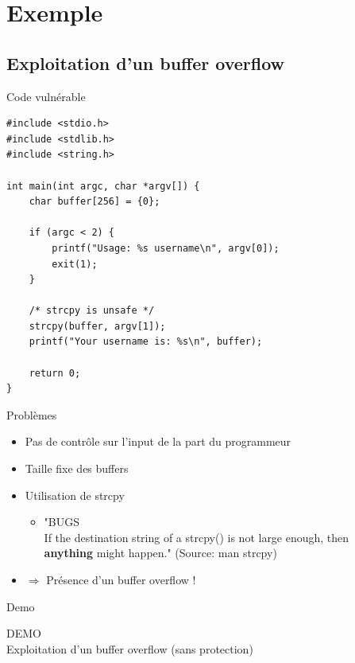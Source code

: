 \documentclass{beamer}
\begin{document}
\section{Exemple}
\subsection{Exploitation d'un buffer overflow}
\begin{frame}[fragile]{Code vulnérable}
	\begin{verbatim}
#include <stdio.h>
#include <stdlib.h>
#include <string.h>

int main(int argc, char *argv[]) {
    char buffer[256] = {0};

    if (argc < 2) {
        printf("Usage: %s username\n", argv[0]);
        exit(1);
    }

    /* strcpy is unsafe */
    strcpy(buffer, argv[1]);
    printf("Your username is: %s\n", buffer);

    return 0;
}
	\end{verbatim}
\end{frame}

\begin{frame}{Problèmes}
	\begin{itemize}
		\itemsep1.3em
		\item Pas de contrôle sur l'input de la part du programmeur
		\item Taille fixe des buffers
		\item Utilisation de strcpy
		\begin{itemize}
			\itemsep1.3em
			\item[] "BUGS\\
       If the destination string of a strcpy() is not large enough, then\\
       \textbf{anything}  might  happen." (Source: man strcpy)
		\end{itemize}
		\item[] $\Rightarrow$ \Large{Présence d'un buffer overflow !}
	\end{itemize}
\end{frame}

\begin{frame}{Demo}
	\begin{center}
		\Huge{DEMO} \\
		\Large{Exploitation d'un buffer overflow (sans protection)}
	\end{center}
\end{frame}
\end{document}

